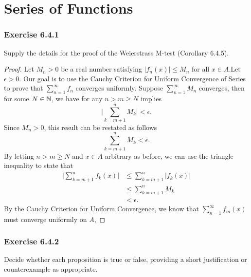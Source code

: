 \section{Series of Functions}

\subsubsection{Exercise 6.4.1} Supply the details for the proof of the Weierstrass M-test (Corollary 6.4.5).

\begin{proof}
Let \( M_n > 0  \) be a real number satisfying \( | f_n(x)  | \leq M_n  \) for all \( x \in A  \).Let \( \epsilon > 0 \). Our goal is to use the Cauchy Criterion for Uniform Convergence of Series to prove that \( \sum_{ n=1 }^{ \infty  } f_n  \) converges uniformly. Suppose \( \sum_{ n=1 }^{ \infty  } M_n  \) converges, then for some \( N \in \mathbb{N}  \), we have for any \( n > m \geq N  \) implies 
\[ \Big| \sum_{ k=m+1 }^{ n } M_k \Big| < \epsilon.   \]
Since \( M_n > 0  \), this result can be restated as follows
\[  \sum_{ k=m+1 }^{ n } M_k < \epsilon. \]
By letting \( n > m \geq N  \) and \( x \in A  \) arbitrary as before, we can use the triangle inequality to state that 
\begin{align*}
    \Big| \sum_{ k=m+1 }^{ n } f_k(x)  \Big| &\leq \sum_{ k=m+1 }^{ n }| f_k(x)  |  \\
                                             &\leq  \sum_{ k=m+1 }^{ n } M_k \\
                                             &< \epsilon.
\end{align*}
By the Cauchy Criterion for Uniform Convergence, we know that \( \sum_{ n=1 }^{ \infty  } f_m(x)  \) must converge uniformly on \( A  \),
\end{proof}

\subsubsection{Exercise 6.4.2} Decide whether each proposition is true or false, providing a short justification or counterexample as appropriate.  

